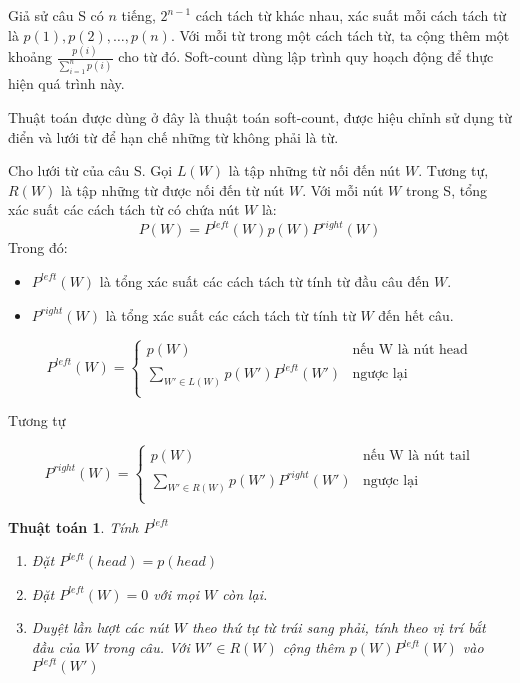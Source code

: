 \documentclass[a4paper,oneside]{book} %
\newtheorem{algo}{Thuật toán}
\begin{document}
Giả sử câu S có $n$ tiếng, $2^{n-1}$ cách tách từ khác nhau, xác suất
mỗi cách tách từ là $p(1),p(2),\ldots,p(n)$.
Với mỗi từ trong một cách tách từ, ta cộng thêm một khoảng
$\displaystyle\frac{p(i)}{\sum_{i=1}^n{p(i)}}$ cho từ đó. Soft-count dùng
lập trình quy hoạch động để thực hiện quá trình này.

Thuật toán được dùng ở đây là thuật toán soft-count, được hiệu chỉnh
sử dụng từ điển và lưới từ để hạn chế những từ không phải là từ.

Cho lưới từ của câu S. Gọi $L(W)$ là tập những từ nối đến nút
$W$. Tương tự, $R(W)$ là tập những từ được nối đến từ nút $W$.
Với mỗi nút $W$ trong S, tổng xác suất các cách tách từ có chứa nút
$W$ là:
$$P(W)=P^{left}(W)p(W)P^{right}(W)$$
Trong đó:
\begin{itemize}
\item $P^{left}(W)$ là tổng xác suất các cách tách từ tính từ đầu câu
  đến $W$.
\item $P^{right}(W)$ là tổng xác suất các cách tách từ tính từ $W$ đến
  hết câu.
\end{itemize}

$$
P^{left}(W) = \left\{
    \begin{array}{ll}
      p(W)&\text{nếu W là nút head}\\
      \displaystyle\sum_{W' \in L(W)}p(W')P^{left}(W')&\text{ngược lại}\\
    \end{array}
  \right.
$$

Tương tự

$$
P^{right}(W) = \left\{
    \begin{array}{ll}
      p(W)&\text{nếu W là nút tail}\\
      \displaystyle\sum_{W' \in R(W)}p(W')P^{right}(W')&\text{ngược lại}\\
    \end{array}
  \right.
$$

\begin{algo}Tính $P^{left}$

\begin{enumerate}
\item Đặt $P^{left}(head) = p(head)$
\item Đặt $P^{left}(W) = 0$ với mọi $W$ còn lại.
\item Duyệt lần lượt các nút $W$ theo thứ tự từ trái sang phải, tính
  theo vị trí bắt đầu của $W$ trong câu. Với $W' \in R(W)$
  cộng thêm $p(W)P^{left}(W)$ vào $P^{left}(W')$
\end{enumerate}
\end{algo}
\end{document}
